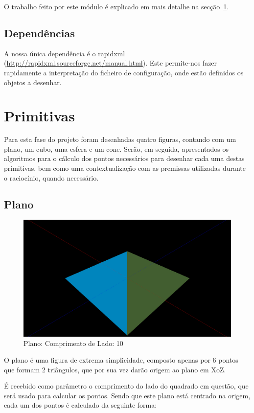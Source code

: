 \documentclass[a4paper]{article}
\begin{document}
O trabalho feito por este módulo é explicado em mais detalhe na secção~\ref{sec:primitivas}.

\subsection{Dependências}

A nossa única dependência é o rapidxml (\url{http://rapidxml.sourceforge.net/manual.html}). Este permite-nos fazer rapidamente a interpretação do ficheiro de configuração, onde estão definidos os objetos a desenhar.

\section{Primitivas}\label{sec:primitivas}

Para esta fase do projeto foram desenhadas quatro figuras, contando com um plano, um cubo, uma esfera e um cone. Serão, em seguida, apresentados os algoritmos para o cálculo dos pontos necessários para desenhar cada uma destas primitivas, bem como uma contextualização com as premissas utilizadas durante o raciocínio, quando necessário.

\subsection{Plano}
\begin{figure}[H]
    \centering
    \includegraphics[width=\textwidth]{plane.png}
    \caption{Plano: Comprimento de Lado: 10}
\end{figure}

O plano é uma figura de extrema simplicidade, composto apenas por 6 pontos que formam 2 triângulos, que por sua vez darão origem ao plano em XoZ.

É recebido como parâmetro o comprimento do lado do quadrado em questão, que será usado para calcular os pontos. Sendo que este plano está centrado na origem, cada um dos pontos é calculado da seguinte forma:
\end{document}
